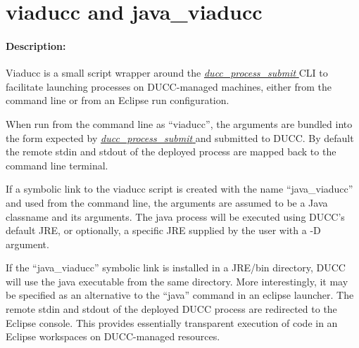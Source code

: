 % 
% 
% 
% 
\ifpdf
\else
{}
\fi
    \section{viaducc and java\_viaducc}
    \label{sec:cli.viaducc}

    \paragraph{Description:}
        Viaducc is a small script wrapper around the \hyperref[sec:cli.ducc-process-submit]{\em
          ducc\_process\_submit } CLI to facilitate launching processes on DUCC-managed machines,
          either from the command line or from an Eclipse run configuration.

        \begin{sloppypar}
          When run from the command line as ``viaducc'', the arguments are bundled into the form expected by
          \hyperref[sec:cli.ducc-process-submit]{\em ducc\_process\_submit } and submitted to DUCC.
          By default the remote stdin and stdout of the deployed process are mapped back to the 
          command line terminal.
        \end{sloppypar}
        
        If a symbolic link to the viaducc script is created with the name ``java\_viaducc''
        and used from the command line,
        the arguments are assumed to be a Java classname and its arguments.
        The java process will be executed using DUCC's default JRE, or
        optionally, a specific JRE supplied by the user with a -D argument.

        If the ``java\_viaducc'' symbolic link is installed in a JRE/bin directory, DUCC will use
        the java executable from the same directory. More interestingly, it may be specified as an alternative
        to the ``java'' command in an eclipse launcher.  The remote stdin and stdout of the deployed
        DUCC process are redirected to the Eclipse console.  This provides essentially transparent
        execution of code in an Eclipse workspaces on DUCC-managed resources.

